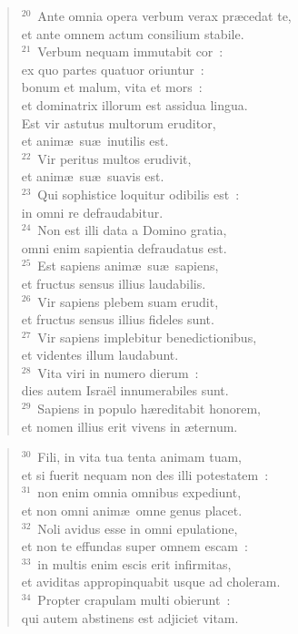 \begin{flushleft}\begin{verse}${}^{20}$~Ante omnia opera verbum verax pr\ae cedat te,\\ et ante omnem actum consilium stabile.\\
${}^{21}$~Verbum nequam immutabit cor~:\\ ex quo partes quatuor oriuntur~:\\ bonum et malum, vita et mors~:\\ et dominatrix illorum est assidua lingua.\\ Est vir astutus multorum eruditor,\\ et anim\ae\ su\ae\ inutilis est.\\
${}^{22}$~Vir peritus multos erudivit,\\ et anim\ae\ su\ae\ suavis est.\\
${}^{23}$~Qui sophistice loquitur odibilis est~:\\ in omni re defraudabitur.\\
${}^{24}$~Non est illi data a Domino gratia,\\ omni enim sapientia defraudatus est.\\
${}^{25}$~Est sapiens anim\ae\ su\ae\ sapiens,\\ et fructus sensus illius laudabilis.\\
${}^{26}$~Vir sapiens plebem suam erudit,\\ et fructus sensus illius fideles sunt.\\
${}^{27}$~Vir sapiens implebitur benedictionibus,\\ et videntes illum laudabunt.\\
${}^{28}$~Vita viri in numero dierum~:\\ dies autem Isra\"el innumerabiles sunt.\\
${}^{29}$~Sapiens in populo h\ae reditabit honorem,\\ et nomen illius erit vivens in \ae ternum.\end{verse}\end{flushleft}


\begin{flushleft}\begin{verse}${}^{30}$~Fili, in vita tua tenta animam tuam,\\ et si fuerit nequam non des illi potestatem~:\\
${}^{31}$~non enim omnia omnibus expediunt,\\ et non omni anim\ae\ omne genus placet.\\
${}^{32}$~Noli avidus esse in omni epulatione,\\ et non te effundas super omnem escam~:\\
${}^{33}$~in multis enim escis erit infirmitas,\\ et aviditas appropinquabit usque ad choleram.\\
${}^{34}$~Propter crapulam multi obierunt~:\\ qui autem abstinens est adjiciet vitam.\end{verse}\end{flushleft}



